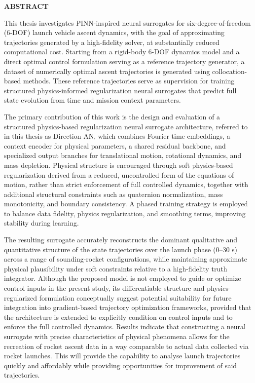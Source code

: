 \newpage

\begin{center}
    \fontsize{14}{16}\selectfont
    \textbf{ABSTRACT}
\end{center}
\vspace{-0.3cm}
\doublespacing
\justifying
This thesis investigates PINN-inspired neural surrogates for six-degree-of-freedom (6-DOF) launch vehicle ascent dynamics, 
with the goal of approximating trajectories generated by a high-fidelity solver, at substantially reduced computational cost. 
Starting from a rigid-body 6-DOF dynamics model and a direct optimal control formulation serving as a reference trajectory generator, 
a dataset of numerically optimal ascent trajectories is generated using collocation-based methods. These reference trajectories serve as 
supervision for training structured physics-informed regularization neural surrogates that predict full state evolution from time and mission 
context parameters.

The primary contribution of this work is the design and evaluation of a structured physics-based regularization neural surrogate architecture, 
referred to in this thesis as Direction AN, which combines Fourier time embeddings, a context encoder for physical parameters, a shared 
residual backbone, and specialized output branches for translational motion, rotational dynamics, and mass depletion. Physical structure 
is encouraged through soft physics-based regularization derived from a reduced, uncontrolled form of the equations of motion, rather 
than strict enforcement of full controlled dynamics, together with additional structural constraints such as quaternion normalization, 
mass monotonicity, and boundary consistency. A phased training strategy is employed to balance data fidelity, physics regularization, 
and smoothing terms, improving stability during learning.

The resulting surrogate accurately reconstructs the dominant qualitative and quantitative structure of the state trajectories over the launch phase (0–30 s) across 
a range of sounding-rocket configurations, while maintaining approximate physical plausibility under soft constraints relative to a high-fidelity 
truth integrator. Although the proposed model is not employed to guide or optimize control inputs in the present study, its differentiable structure 
and physics-regularized formulation conceptually suggest potential suitability for future integration into gradient-based trajectory optimization 
frameworks, provided that the architecture is extended to explicitly condition on control inputs and to enforce the full controlled dynamics. 
Results indicate that constructing a neural surrogate with precise characteristics of physical phenomena allows for the recreation of rocket 
ascent data in a way comparable to actual data collected via rocket launches. This will provide the capability to analyse launch trajectories 
quickly and affordably while providing opportunities for improvement of said trajectories.



